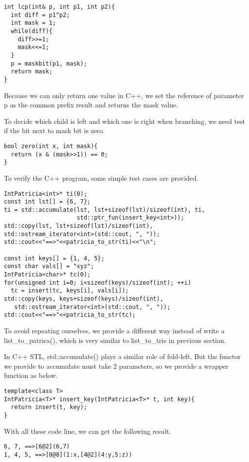 \documentclass{article}
\begin{document}
\begin{lstlisting}
int lcp(int& p, int p1, int p2){
  int diff = p1^p2;
  int mask = 1;
  while(diff){
    diff>>=1;
    mask<<=1;
  }
  p = maskbit(p1, mask);
  return mask;
}
\end{lstlisting}

Because we can only return one value in C++, we set the reference of 
parameter p as the common prefix result and returns the mask value.

To decide which child is left and which one is right when branching,
we need test if the bit next to mask bit is zero. 

\begin{lstlisting}
bool zero(int x, int mask){
  return (x & (mask>>1)) == 0;
}
\end{lstlisting}

To verify the C++ program, some simple test cases are provided.

\begin{lstlisting}
IntPatricia<int>* ti(0);
const int lst[] = {6, 7};
ti = std::accumulate(lst, lst+sizeof(lst)/sizeof(int), ti, 
                     std::ptr_fun(insert_key<int>));
std::copy(lst, lst+sizeof(lst)/sizeof(int),
std::ostream_iterator<int>(std::cout, ", "));
std::cout<<"==>"<<patricia_to_str(ti)<<"\n";

const int keys[] = {1, 4, 5};
const char vals[] = "xyz";
IntPatricia<char>* tc(0);
for(unsigned int i=0; i<sizeof(keys)/sizeof(int); ++i)
  tc = insert(tc, keys[i], vals[i]);
std::copy(keys, keys+sizeof(keys)/sizeof(int),
   std::ostream_iterator<int>(std::cout, ", "));
std::cout<<"==>"<<patricia_to_str(tc);
\end{lstlisting}

To avoid repeating ourselves, we provide a different way instead of
write a list\_to\_patrica(), which is very similar to list\_to\_trie
in previous section.

In C++ STL, std::accumulate() plays a similar role of fold-left. But the
functor we provide to accumulate must take 2 parameters, so we provide a 
wrapper function as below.

\begin{lstlisting}
template<class T>
IntPatricia<T>* insert_key(IntPatricia<T>* t, int key){
  return insert(t, key);
}
\end{lstlisting}

With all these code line, we can get the following result.
\begin{verbatim}
6, 7, ==>[6@2](6,7)
1, 4, 5, ==>[0@8](1:x,[4@2](4:y,5:z))
\end{verbatim}
\end{document}
